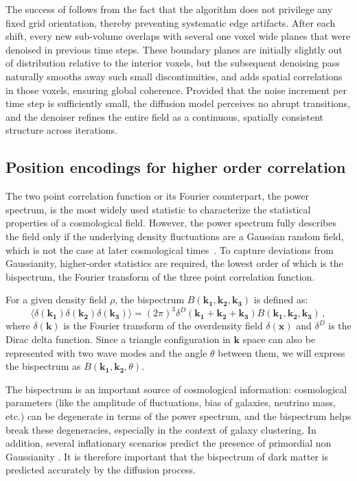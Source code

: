 The success of \FOLD follows from the fact that the algorithm does not privilege any fixed grid orientation, thereby preventing systematic edge artifacts.
After each shift, every new sub-volume overlaps with several one voxel wide planes that were denoised in previous time steps.
These boundary planes are initially slightly out of distribution relative to the interior voxels, but the subsequent denoising pass naturally smooths away such small discontinuities, and adds spatial correlations in those voxels, ensuring global coherence.
Provided that the noise increment per time step is sufficiently small, the diffusion model perceives no abrupt transitions, and the denoiser refines the entire field as a continuous, spatially consistent structure across iterations.


\subsection{Position encodings for higher order correlation}
\label{bispectrum}

The two point correlation function or its Fourier counterpart, the power spectrum, is the most widely used statistic to characterize the statistical properties of a cosmological field. However, the power spectrum fully describes the field only if the underlying density fluctuations are a Gaussian random field, which is not the case at later cosmological times~\citep{Bernardeau_2002,sefu06}. To capture deviations from Gaussianity, higher-order statistics are required, the lowest order of which is the bispectrum, the Fourier transform of the three point correlation function.

For a given density field $\rho$, the bispectrum $B(\mathbf{k_1},\mathbf{k_2},\mathbf{k_3})$ is defined as:
\begin{equation}
    \langle \delta(\mathbf{k_1})\delta(\mathbf{k_2})\delta(\mathbf{k_3}) \rangle = (2\pi)^3 \delta^D(\mathbf{k_1}+\mathbf{k_2}+\mathbf{k_3})B(\mathbf{k_1},\mathbf{k_2},\mathbf{k_3}) \,,
\end{equation}
where $\delta(\mathbf{k})$ is the Fourier transform of the overdensity field $\delta(\mathbf{x})$ and $\delta^D$ is the Dirac delta function. Since a triangle configuration in $\textbf{k}$ space can also be represented with two wave modes and the angle $\theta$ between them, we will express the  bispectrum as $B( \mathbf{k_1},\mathbf{k_2}, \theta)$.

The bispectrum is an important source of cosmological information: cosmological parameters (like the amplitude of fluctuations, bias of galaxies, neutrino mass, etc.) can be degenerate in terms of the power spectrum, and the bispectrum  helps break these degeneracies, especially in the context of galaxy clustering. In addition, several inflationary scenarios predict the presence of primordial non Gaussianity \citep{Bartolo_2004}. It is therefore important that the bispectrum of dark matter is predicted accurately by the diffusion process.

